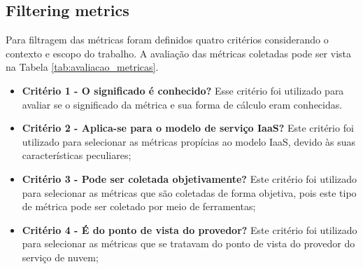 \documentclass[conference]{IEEEtran}
\begin{document}
     
  \subsection{Filtering metrics}
  
      Para filtragem das métricas foram definidos quatro critérios considerando o contexto e escopo do trabalho. A avaliação das
      métricas coletadas pode ser vista na Tabela \ref{tab:avaliacao_metricas}.
   
	\begin{itemize}
	 \item \textbf{Critério 1 - O significado é conhecido?}
	    \subitem Esse critério foi utilizado para avaliar se o significado da métrica e sua forma de cálculo eram conhecidas.
	 \item \textbf{Critério 2 - Aplica-se para o modelo de serviço IaaS?}
	    \subitem Este critério foi utilizado para selecionar as métricas propícias ao modelo IaaS, 
	    devido às suas características peculiares;
	 \item \textbf{Critério 3 - Pode ser coletada objetivamente?}
	    \subitem Este critério foi utilizado para selecionar as métricas que são coletadas de forma objetiva, pois este tipo
	    de métrica pode ser coletado por meio de ferramentas;
	 \item \textbf{Critério 4 - É do ponto de vista do provedor?}
	    \subitem Este critério foi utilizado para selecionar as métricas que se tratavam do ponto de vista do provedor do serviço
	    de nuvem;
	\end{itemize}
	
\end{document}
